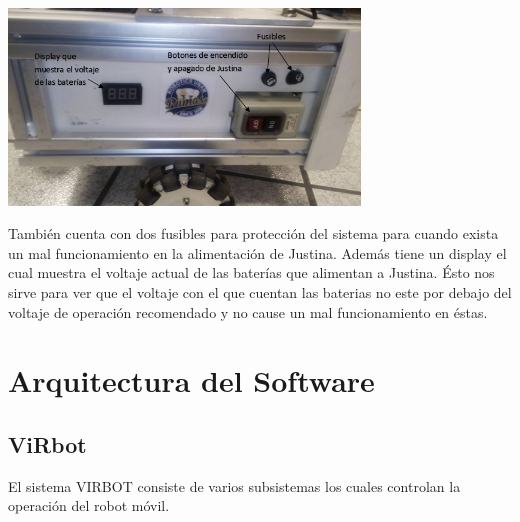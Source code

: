 \documentclass[a4paper,usenames,dvipsnames,svgnames,table]{book}
\begin{document}
\begin{center}
\includegraphics[width=0.7\textwidth]{Figures/Hardware/Diagramas/Encendido.png}
\label{fig:Hardware:Diagramas:Justina:Encendido}
\end{center}

También cuenta con dos fusibles para protección del sistema para cuando exista un mal funcionamiento en la alimentación de 
Justina. Además tiene un display el cual muestra el voltaje actual de las baterías que alimentan a Justina. Ésto nos sirve
para ver que el voltaje con el que cuentan las baterias no este por debajo del voltaje de operación recomendado y no cause
un mal funcionamiento en éstas.


\chapter{Arquitectura del Software}
\section{ViRbot}
El sistema VIRBOT consiste de varios subsistemas los cuales controlan la operación del robot móvil.
\end{document}

